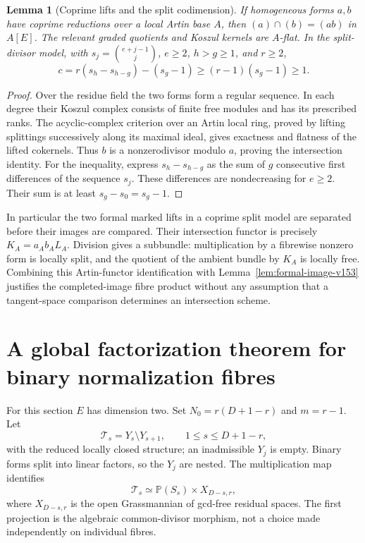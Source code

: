 \documentclass[11pt,reqno]{amsart}
\numberwithin{equation}{section}
\newtheorem{lemma}[theorem]{Lemma}
\theoremstyle{definition}\newtheorem{definition}[theorem]{Definition}
\theoremstyle{remark}\newtheorem{remark}[theorem]{Remark}
\newcommand{\Pj}{\mathbb P}\newcommand{\A}{\mathbb A}
\begin{document}
\begin{lemma}[Coprime lifts and the split codimension]
\label{lem:coprime-lifts-v153}
If homogeneous forms $a,b$ have coprime reductions over a local Artin
base $A$, then $(a)\cap(b)=(ab)$ in $A[E]$. The relevant graded
quotients and Koszul kernels are $A$-flat. In the split-divisor model,
with $s_j=\binom{e+j-1}{j}$, $e\geq2$, $h>g\geq1$, and $r\geq2$,
\[
 c=r(s_h-s_{h-g})-(s_g-1)\geq(r-1)(s_g-1)\geq1.
\]
\end{lemma}
\begin{proof}
Over the residue field the two forms form a regular sequence. In
each degree their Koszul complex consists of finite free modules and
has its prescribed ranks. The acyclic-complex criterion over an Artin
local ring, proved by lifting splittings successively along its maximal
ideal, gives exactness and flatness of the lifted cokernels. Thus $b$
is a nonzerodivisor modulo $a$, proving the intersection identity.
For the inequality, express $s_h-s_{h-g}$ as the sum of $g$ consecutive
first differences of the sequence $s_j$. These differences are
nondecreasing for $e\geq2$. Their sum is at least $s_g-s_0=s_g-1$.
\end{proof}

In particular the two formal marked lifts in a coprime split model
are separated before their images are compared. Their intersection
functor is precisely $K_A=a_A b_A L_A$. Division gives a subbundle:
multiplication by a fibrewise nonzero form is locally split, and the
quotient of the ambient bundle by $K_A$ is locally free. Combining
this Artin-functor identification with Lemma~\ref{lem:formal-image-v153}
justifies the completed-image fibre product without any assumption
that a tangent-space comparison determines an intersection scheme.

\section{A global factorization theorem for binary normalization fibres}
\label{sec:binary-fibres-v153}
For this section $E$ has dimension two. Set $N_0=r(D+1-r)$ and
$m=r-1$. Let
\[
 \mathcal T_s=Y_s\setminus Y_{s+1},\qquad 1\leq s\leq D+1-r,
\]
with the reduced locally closed structure; an inadmissible $Y_j$ is
empty. Binary forms split into linear factors, so the $Y_j$ are
nested. The multiplication map identifies
\[
 \mathcal T_s\simeq\Pj(S_s)\times X_{D-s,r},
\]
where $X_{D-s,r}$ is the open Grassmannian of gcd-free residual spaces.
The first projection is the algebraic common-divisor morphism, not a
choice made independently on individual fibres.
\end{document}
